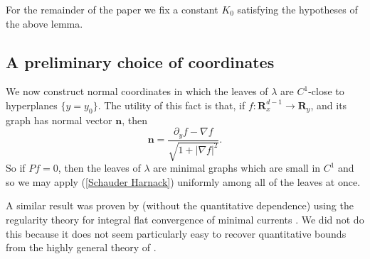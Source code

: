 \documentclass[reqno,11pt]{amsart}
\newcommand{\RR}{\mathbf{R}}
\newcommand{\normal}{\mathbf n}
\theoremstyle{definition}
\numberwithin{equation}{section}
\begin{document}
For the remainder of the paper we fix a constant $K_0$ satisfying the hypotheses of the above lemma.

\subsection{A preliminary choice of coordinates}
We now construct normal coordinates in which the leaves of $\lambda$ are $C^1$-close to hyperplanes $\{y = y_0\}$.
The utility of this fact is that, if $f: \RR^{d - 1}_x \to \RR_y$, and its graph has normal vector $\normal$, then
\begin{equation}\label{nabla as a normal}
	\normal = \frac{\partial_y f - \nabla f}{\sqrt{1 + |\nabla f|^2}}.
\end{equation}
So if $Pf = 0$, then the leaves of $\lambda$ are minimal graphs which are small in $C^1$ and so we may apply (\ref{Schauder Harnack}) uniformly among all of the leaves at once.

A similar result was proven by \cite{Solomon86} (without the quantitative dependence) using the regularity theory for integral flat convergence of minimal currents \cite[Theorem 5.3.14]{federer2014geometric}.
We did not do this because it does not seem particularly easy to recover quantitative bounds from the highly general theory of \cite[Chapter 5]{federer2014geometric}.
\end{document}
